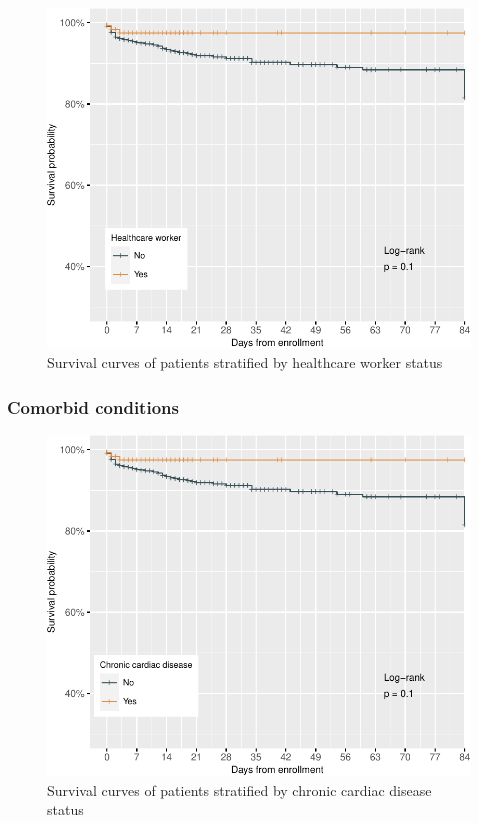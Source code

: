 \documentclass[
  10pt,
]{article}
\begin{document}
\newpage

\begin{figure}[h]

{\centering \includegraphics{results_files/figure-latex/health-worker-1} 

}

\caption{Survival curves of patients stratified by healthcare worker status}\label{fig:health-worker}
\end{figure}

\newpage

\hypertarget{comorbid-conditions}{%
\subsubsection{Comorbid conditions}\label{comorbid-conditions}}

\begin{figure}[h]

{\centering \includegraphics{results_files/figure-latex/cardiac-disease-1} 

}

\caption{Survival curves of patients stratified by chronic cardiac disease status}\label{fig:cardiac-disease}
\end{figure}
\end{document}

